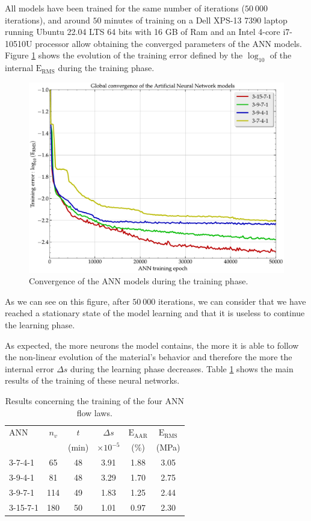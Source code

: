 \documentclass[algorithms,article,submit,pdftex,moreauthors]{Definitions/mdpi}
\DeclareRobustCommand{\RMSE}{\text{E}_\text{RMS}}
\DeclareRobustCommand{\AARE}{\text{E}_\text{AAR}}
\begin{document}
All models have been trained for the same number of iterations ($50~000$ iterations), and around $50$ minutes of training on a Dell XPS-13 7390 laptop running Ubuntu 22.04 LTS 64 bits with 16 GB of Ram and an Intel 4-core i7-10510U processor allow obtaining the converged parameters of the ANN models.
Figure \ref{fig:Convergence-ANN} shows the evolution of the training error defined by the $\log_{10}$ of the internal $\RMSE$ during the training phase.
\begin{figure}[!ht]
\centering
\includegraphics[width=0.9\columnwidth]{Figures/Convergence-ANN}
\caption{Convergence of the ANN models during the training phase.}
\label{fig:Convergence-ANN}
\end{figure}
As we can see on this figure, after $50~000$ iterations, we can consider that we have reached a stationary state of the model learning and that it is useless to continue the learning phase.

As expected, the more neurons the model contains, the more it is able to follow the non-linear evolution of the material's behavior and therefore the more the internal error $\Delta s$ during the learning phase decreases. 
Table \ref{tab:ErrorANN} shows the main results of the training of these neural networks. 
\begin{table}[h!]
\centering
\caption{Results concerning the training of the four ANN flow laws.}
\begin{tabular}{lccccc}
	\hline
	ANN    & $n_v$ &  $t$  &    $\Delta s$    & $\AARE$ & $\RMSE$ \\
	         &     & (min) & $\times 10^{-5}$ &  (\%)   &  (MPa)  \\ \hline
	3-7-4-1  & 65  &  48   &       3.91       &  1.88   &  3.05   \\
	3-9-4-1  & 81  &  48   &       3.29       &  1.70   &  2.75   \\
	3-9-7-1  & 114 &  49   &       1.83       &  1.25   &  2.44   \\
	3-15-7-1 & 180 &  50   &       1.01       &  0.97   &  2.30\\ \hline
\end{tabular}
\label{tab:ErrorANN}
\end{table}
\end{document}

